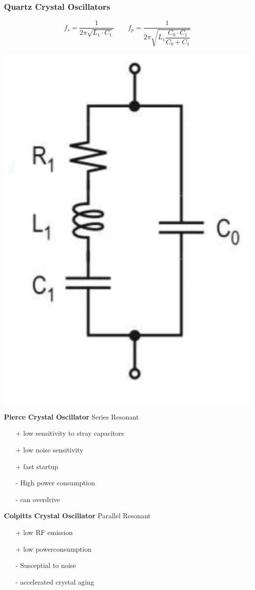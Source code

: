 \subsubsection{Quartz Crystal Oscillators}
\vspace{-1cm}
\begin{minipage}{0.5\linewidth}
    \[ f_s=\dfrac{1}{2\pi \sqrt{L_1 \cdot C_1}}\qquad f_p=\dfrac{1}{2\pi \sqrt{L_1 \dfrac{C_0 \cdot C_1}{C_0 + C_1}}} \]
\end{minipage}
\begin{minipage}{0.5\linewidth}
    \hspace{2cm}\includegraphics[angle=90 ,width=0.4\linewidth]{images/QuartzESB} 
\end{minipage}
\begin{multicols}{2}
    \begin{minipage}{\linewidth}
        \textbf{Pierce Crystal Oscillator}\newline
        Series Resonant
        \begin{itemize}
            \item [+] low sensitivity to stray capacitors
            \item [+] low noise sensitivity
            \item [+] fast startup
            \item [-] High power consumption
            \item [-] can overdrive
        \end{itemize}
    \end{minipage}
    
    \begin{minipage}{\linewidth}
        \textbf{Colpitts Crystal Oscillator}\newline
       Parallel Resonant
        \begin{itemize}
            \item [+] low \acs{RF} emission
            \item [+] low powerconsumption
            \item [-] Susceptial to noise
            \item [-] accelerated crystal aging
        \end{itemize}
    \end{minipage}
\end{multicols}

